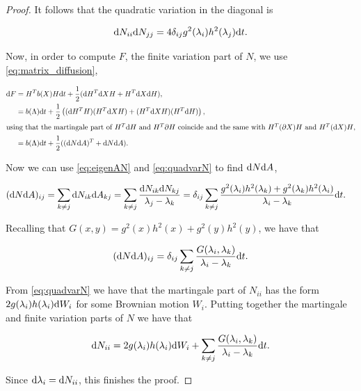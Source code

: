 \begin{proof}
    It follows that the quadratic variation in the diagonal is

    \begin{equation*}
        \mathrm d N_{ii} \mathrm d N_{jj} = 4\delta_{ij}g^2(\lambda_i)h^2(\lambda_j)\mathrm d t.
    \end{equation*}

    Now, in order to compute $F$, the finite variation part of $N$, we use \eqref{eq:matrix_diffusion},

    \begin{align*}
        \mathrm d F &= H^Tb(X)H\mathrm d t + \frac12(\mathrm d H^T \mathrm d X H + H^T \mathrm d X \mathrm d H),\\
        &= b(\Lambda)\mathrm d t + \frac12 \left( (\mathrm d H^T H)(H^T\mathrm d X H) + (H^T \mathrm d X H)(H^T \mathrm d H) \right),\\
        \intertext{using that the martingale part of $H^T\mathrm d H$ and $H^T\partial H$ coincide and the same with $H^T(\partial X)H$ and $H^T (\mathrm d X) H$,}
        &= b(\Lambda)\mathrm d t + \frac12( (\mathrm d N \mathrm d A)^T + \mathrm d N \mathrm d A).
    \end{align*}

    Now we can use \eqref{eq:eigenAN} and \eqref{eq:quadvarN} to find $\mathrm d N \mathrm d A$,

    \begin{align*}
        (\mathrm d N \mathrm d A)_{ij} &= \sum_{k \neq j} \mathrm d N_{ik}\mathrm d A_{kj} = \sum_{k\neq j} \frac{\mathrm d N_{ik}\mathrm d N_{kj}}{\lambda_j - \lambda_k} = \delta_{ij}\sum_{k\neq j} \frac{ g^2(\lambda_i)h^2(\lambda_k) + g^2(\lambda_k)h^2(\lambda_i) }{\lambda_i - \lambda_k} \mathrm d t.
    \end{align*}

    Recalling that $G(x,y) = g^2(x)h^2(x) + g^2(y)h^2(y)$, we have that

    \begin{equation*}
        (\mathrm d N \mathrm d A)_{ij} = \delta_{ij}\sum_{k\neq j} \frac{ G(\lambda_i,\lambda_k) }{\lambda_i - \lambda_k} \mathrm d t.
    \end{equation*}

    From \eqref{eq:quadvarN} we have that the martingale part of $N_{ii}$ has the form
    $2g(\lambda_i)h(\lambda_i)\mathrm d W_i$ for some Brownian motion $W_i$. Putting together the martingale and finite variation parts of $N$ we have that

    \begin{equation*}
        \mathrm d N_{ii} = 2g(\lambda_i)h(\lambda_i)\mathrm d W_i + \sum_{k\neq j} \frac{ G(\lambda_i,\lambda_k) }{\lambda_i - \lambda_k} \mathrm d t.
    \end{equation*}

    Since $\mathrm d \lambda_i = \mathrm d N_{ii}$, this finishes the proof.
\end{proof}






